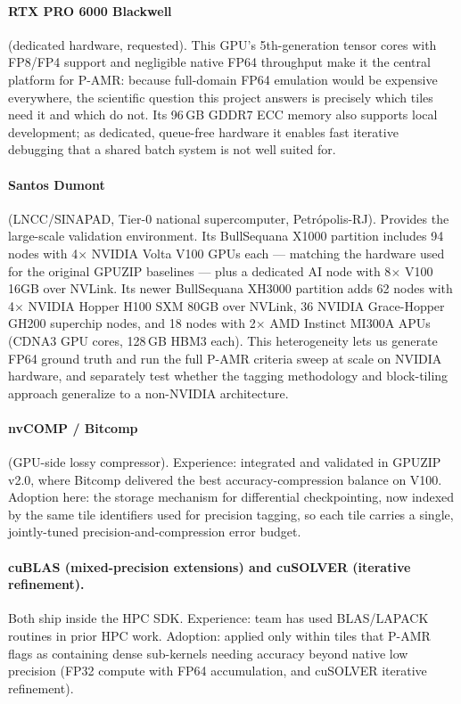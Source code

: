 \documentclass[12pt,a4paper]{article}
\newcommand{\pamr}{P\nobreakdash-AMR}
\begin{document}
\paragraph{RTX PRO 6000 Blackwell} (dedicated hardware, requested). This GPU's
5th-generation tensor cores with FP8/FP4 support and negligible native FP64
throughput make it the central platform for \pamr{}: because full-domain FP64
emulation would be expensive everywhere, the scientific question this project
answers is precisely which tiles need it and which do not. Its 96\,GB GDDR7 ECC
memory also supports local development; as dedicated, queue-free hardware it
enables fast iterative debugging that a shared batch system is not well suited
for.

\paragraph{Santos Dumont} (LNCC/SINAPAD, Tier-0 national supercomputer,
Petr\'opolis-RJ). Provides the large-scale validation environment. Its
BullSequana X1000 partition includes 94 nodes with 4$\times$ NVIDIA Volta V100
GPUs each --- matching the hardware used for the original GPUZIP baselines ---
plus a dedicated AI node with 8$\times$ V100 16GB over NVLink. Its newer
BullSequana XH3000 partition adds 62 nodes with 4$\times$ NVIDIA Hopper H100 SXM
80GB over NVLink, 36 NVIDIA Grace-Hopper GH200 superchip nodes, and 18 nodes
with 2$\times$ AMD Instinct MI300A APUs (CDNA3 GPU cores, 128\,GB HBM3 each).
This heterogeneity lets us generate FP64 ground truth and run the full \pamr{}
criteria sweep at scale on NVIDIA hardware, and separately test whether the
tagging methodology and block-tiling approach generalize to a non-NVIDIA
architecture.

\paragraph{nvCOMP / Bitcomp} (GPU-side lossy compressor). Experience: integrated
and validated in GPUZIP v2.0, where Bitcomp delivered the best
accuracy-compression balance on V100. Adoption here: the storage mechanism for
differential checkpointing, now indexed by the same tile identifiers used for
precision tagging, so each tile carries a single, jointly-tuned
precision-and-compression error budget.

\paragraph{cuBLAS (mixed-precision extensions) and cuSOLVER (iterative
refinement).} Both ship inside the HPC SDK. Experience: team has used
BLAS/LAPACK routines in prior HPC work. Adoption: applied only within tiles that
\pamr{} flags as containing dense sub-kernels needing accuracy beyond native low
precision (FP32 compute with FP64 accumulation, and cuSOLVER iterative
refinement).
\end{document}
